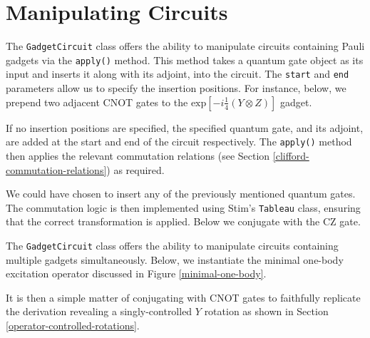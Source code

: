 \section{Manipulating Circuits}%
\label{manipulating-circuits}

The \lstinline{GadgetCircuit} class offers the ability to manipulate circuits containing Pauli gadgets via the \lstinline{apply()} method. This method takes a quantum gate object as its input and inserts it along with its adjoint, into the circuit. The \lstinline{start} and \lstinline{end} parameters allow us to specify the insertion positions. For instance, below, we prepend two adjacent CNOT gates to the $\text{exp} \left[ - i\frac{1}{4} \left(Y \otimes Z \right) \right]$ gadget.


If no insertion positions are specified, the specified quantum gate, and its adjoint, are added at the start and end of the circuit respectively. The \lstinline{apply()} method then applies the relevant commutation relations (see Section \ref{clifford-commutation-relations}) as required.


We could have chosen to insert any of the previously mentioned quantum gates. The commutation logic is then implemented using Stim's \lstinline{Tableau} class, ensuring that the correct transformation is applied. Below we conjugate with the CZ gate.


The \lstinline{GadgetCircuit} class offers the ability to manipulate circuits containing multiple gadgets simultaneously. Below, we instantiate the minimal one-body excitation operator discussed in Figure \ref{minimal-one-body}.


It is then a simple matter of conjugating with CNOT gates to faithfully replicate the derivation revealing a singly-controlled $Y$ rotation as shown in Section \ref{operator-controlled-rotations}.


